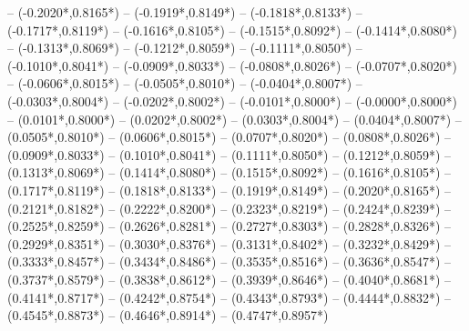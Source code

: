 {	-- ({-0.2020*\dx},{0.8165*\dy})
	-- ({-0.1919*\dx},{0.8149*\dy})
	-- ({-0.1818*\dx},{0.8133*\dy})
	-- ({-0.1717*\dx},{0.8119*\dy})
	-- ({-0.1616*\dx},{0.8105*\dy})
	-- ({-0.1515*\dx},{0.8092*\dy})
	-- ({-0.1414*\dx},{0.8080*\dy})
	-- ({-0.1313*\dx},{0.8069*\dy})
	-- ({-0.1212*\dx},{0.8059*\dy})
	-- ({-0.1111*\dx},{0.8050*\dy})
	-- ({-0.1010*\dx},{0.8041*\dy})
	-- ({-0.0909*\dx},{0.8033*\dy})
	-- ({-0.0808*\dx},{0.8026*\dy})
	-- ({-0.0707*\dx},{0.8020*\dy})
	-- ({-0.0606*\dx},{0.8015*\dy})
	-- ({-0.0505*\dx},{0.8010*\dy})
	-- ({-0.0404*\dx},{0.8007*\dy})
	-- ({-0.0303*\dx},{0.8004*\dy})
	-- ({-0.0202*\dx},{0.8002*\dy})
	-- ({-0.0101*\dx},{0.8000*\dy})
	-- ({-0.0000*\dx},{0.8000*\dy})
	-- ({0.0101*\dx},{0.8000*\dy}) %
	-- ({0.0202*\dx},{0.8002*\dy}) %
	-- ({0.0303*\dx},{0.8004*\dy}) %
	-- ({0.0404*\dx},{0.8007*\dy}) %
	-- ({0.0505*\dx},{0.8010*\dy}) %
	-- ({0.0606*\dx},{0.8015*\dy}) %
	-- ({0.0707*\dx},{0.8020*\dy}) %
	-- ({0.0808*\dx},{0.8026*\dy}) %
	-- ({0.0909*\dx},{0.8033*\dy}) %
	-- ({0.1010*\dx},{0.8041*\dy}) %
	-- ({0.1111*\dx},{0.8050*\dy}) %
	-- ({0.1212*\dx},{0.8059*\dy}) %
	-- ({0.1313*\dx},{0.8069*\dy}) %
	-- ({0.1414*\dx},{0.8080*\dy}) %
	-- ({0.1515*\dx},{0.8092*\dy}) %
	-- ({0.1616*\dx},{0.8105*\dy}) %
	-- ({0.1717*\dx},{0.8119*\dy}) %
	-- ({0.1818*\dx},{0.8133*\dy}) %
	-- ({0.1919*\dx},{0.8149*\dy}) %
	-- ({0.2020*\dx},{0.8165*\dy}) %
	-- ({0.2121*\dx},{0.8182*\dy}) %
	-- ({0.2222*\dx},{0.8200*\dy}) %
	-- ({0.2323*\dx},{0.8219*\dy}) %
	-- ({0.2424*\dx},{0.8239*\dy}) %
	-- ({0.2525*\dx},{0.8259*\dy}) %
	-- ({0.2626*\dx},{0.8281*\dy}) %
	-- ({0.2727*\dx},{0.8303*\dy}) %
	-- ({0.2828*\dx},{0.8326*\dy}) %
	-- ({0.2929*\dx},{0.8351*\dy}) %
	-- ({0.3030*\dx},{0.8376*\dy}) %
	-- ({0.3131*\dx},{0.8402*\dy}) %
	-- ({0.3232*\dx},{0.8429*\dy}) %
	-- ({0.3333*\dx},{0.8457*\dy}) %
	-- ({0.3434*\dx},{0.8486*\dy}) %
	-- ({0.3535*\dx},{0.8516*\dy}) %
	-- ({0.3636*\dx},{0.8547*\dy}) %
	-- ({0.3737*\dx},{0.8579*\dy}) %
	-- ({0.3838*\dx},{0.8612*\dy}) %
	-- ({0.3939*\dx},{0.8646*\dy}) %
	-- ({0.4040*\dx},{0.8681*\dy}) %
	-- ({0.4141*\dx},{0.8717*\dy}) %
	-- ({0.4242*\dx},{0.8754*\dy}) %
	-- ({0.4343*\dx},{0.8793*\dy}) %
	-- ({0.4444*\dx},{0.8832*\dy}) %
	-- ({0.4545*\dx},{0.8873*\dy}) %
	-- ({0.4646*\dx},{0.8914*\dy}) %
	-- ({0.4747*\dx},{0.8957*\dy}) %
}
